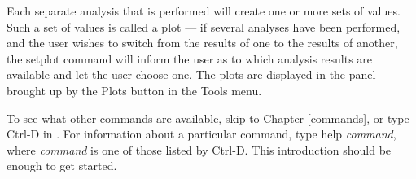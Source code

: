 Each separate analysis that is performed will create one or more sets
of values.  Such a set of values is called a plot --- if several
analyses have been performed, and the user wishes to switch from the
results of one to the results of another, the {\cb setplot} command will
inform the user as to which analysis results are available and let the
user choose one.  The plots are displayed in the panel brought up by
the {\cb Plots} button in the {\cb Tools} menu.

To see what other commands are available, skip to Chapter
\ref{commands}, or type {\kb Ctrl-D} in {\WRspice}.  For
information about a particular command, type {\vt help} {\it
command\/}, where {\it command} is one of those listed by {\kb
Ctrl-D}.  This introduction should be enough to get started.

